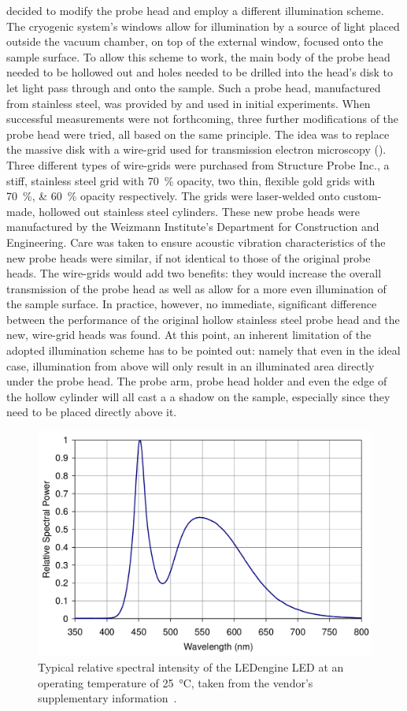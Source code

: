 decided to modify the probe head and employ a different illumination scheme. The cryogenic system's windows allow for illumination by a source of light placed outside the vacuum chamber, on top of the external window, focused onto the sample surface. To allow this scheme to work, the main body of the probe head needed to be hollowed out and holes needed to be drilled into the head's disk to let light pass through and onto the sample. Such a probe head, manufactured from stainless steel, was provided by \McA{} and used in initial experiments. When successful measurements were not forthcoming, three further modifications of the probe head were tried, all based on the same principle. The idea was to replace the massive disk with a wire-grid used for transmission electron microscopy (\tem{}). Three different types of wire-grids were purchased from Structure Probe Inc., a stiff, stainless steel grid with \SI{70}{\percent} opacity, two thin, flexible gold grids with \SIlist{70;60}{\percent} opacity respectively. The grids were laser-welded onto custom-made, hollowed out stainless steel cylinders. These new probe heads were manufactured by the Weizmann Institute's Department for Construction and Engineering. Care was taken to ensure acoustic vibration characteristics of the new probe heads were similar, if not identical to those of the original \McA{} probe heads. The wire-grids would add two benefits: they would increase the overall transmission of the probe head as well as allow for a more even illumination of the sample surface. In practice, however, no immediate, significant difference between the performance of the original hollow stainless steel probe head and the new, \tem{} wire-grid heads was found. At this point, an inherent limitation of the adopted illumination scheme has to be pointed out: namely that even in the ideal case, illumination from above will only result in an illuminated area directly under the probe head. The probe arm, probe head holder and even the edge of the hollow cylinder will all cast a a shadow on the sample, especially since they need to be placed directly above it.\\
\begin{figure}
\centering
	\includegraphics[width=0.8\linewidth]{./figs/ledspec}
	\caption{Typical relative spectral intensity of the LEDengine LED at an operating temperature of \SI{25}{\degreeCelsius}, taken from the vendor's supplementary information~\cite[p. 10]{ledengin}.}
	\label{fig:ledspec}
\end{figure}

